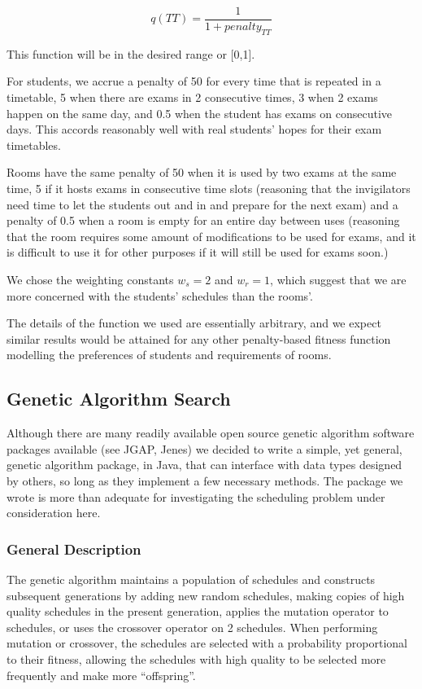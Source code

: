\documentclass[letterpaper]{article}
\begin{document}
    \[ q(TT)=\frac{1}{1+penalty_{TT}} \]
    
    This function will be in the desired range or [0,1].
    
    For students, we accrue a penalty of 50 for every time that is repeated in a 
    timetable, 5 when there are exams in 2 consecutive times, 3 when 2 exams happen 
    on the same day, and 0.5 when the student has exams on consecutive days. This 
    accords reasonably well with real students' hopes for their exam timetables.
    
    Rooms have the same penalty of 50 when it is used by two exams at the same time, 
    5 if it hosts exams in consecutive time slots (reasoning that the invigilators 
    need time to let the students out and in and prepare for the next exam) and a 
    penalty of 0.5 when a room is empty for an entire day between uses (reasoning 
    that the room requires some amount of modifications to be used for exams, and 
    it is difficult to use it for other purposes if it will still be used for exams 
    soon.)
    
    We chose the weighting constants $w_s=2$ and $w_r=1$, which suggest that we are 
    more concerned with the students' schedules than the rooms'.
    
    The details of the function we used are essentially arbitrary, and we expect 
    similar results would be attained for any other penalty-based fitness function 
    modelling the preferences of students and requirements of rooms.
    
  \subsection{Genetic Algorithm Search}
    Although there are many readily available open source genetic algorithm software
    packages available (see JGAP, Jenes) we decided to write a simple, yet general, 
    genetic algorithm package, in Java, that can interface with data types designed 
    by others, so long as they implement a few necessary methods. The package we wrote 
    is more than adequate for investigating the scheduling problem under consideration here.
    
    \subsubsection{General Description}
      The genetic algorithm maintains a population of schedules and constructs subsequent
      generations by adding new random schedules, making copies of high quality schedules 
      in the present generation, applies the mutation operator to schedules, or uses the
      crossover operator on 2 schedules. When performing mutation or crossover, the 
      schedules are selected with a probability proportional to their fitness, allowing 
      the schedules with high quality to be selected more frequently and make more 
      ``offspring''. 
      
\end{document}
